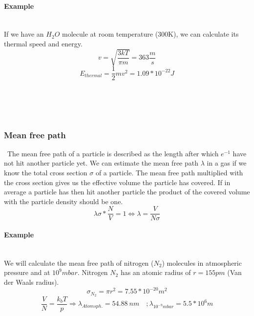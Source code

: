 \documentclass[]{article}
\begin{document}
 \paragraph{Example}
 \mbox{}\\
 If we have an $H_{2}O$ molecule at room temperature (300K), we can calculate its thermal speed and energy.\[ 
 v=\sqrt{\frac{3kT}{\pi m}}=363\frac{m}{s} \]
 \[ E_{thermal}=\frac{1}{2}mv^{2}=1.09*10^{-22}J \]
\\\\\\\\
\subsubsection{Mean free path}\
The mean free path of a particle is described as the length after which $e^{-1}$ have not hit another particle yet. We can estimate the mean free path $\lambda$ in a gas if we know the total cross section $\sigma$  of a particle. The mean free path multiplied with the cross section gives us the effective volume the particle has covered. If in average a particle has then hit another particle the product of the covered volume with the particle density should be one.\[\lambda \sigma *\frac{N}{V}=1 \Leftrightarrow \lambda=\frac{V}{N\sigma}  \]

\paragraph{Example}\mbox{}\\
We will calculate the mean free path of nitrogen ($N_{2}$) molecules in atmospheric pressure and at $10^{9}mbar$. Nitrogen $N_{2}$ has an atomic radius of $r = 155 pm$ (Van der Waals radius). \[\sigma_{N_{2}}=\pi r^{2}=7.55*10^{-20}m^{2} \]\[ \frac{V}{N}=\frac{k_{b}T}{p} \Rightarrow \lambda_{Atomsph.}=54.88\:nm   \quad ;\lambda_{10^{-9}mbar}=5.5*10^{6}m \]
\end{document}

